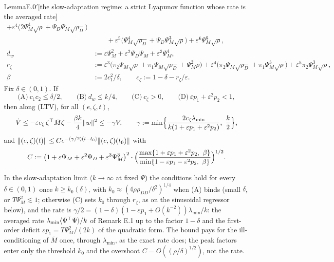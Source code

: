 \begin{thm}{Lemma}{E.0$'$}[the slow-adaptation regime: a strict Lyapunov function whose rate is the averaged rate]
\begin{align*}
    +\varepsilon^4\bigl(2\Psi_M^4\sqrt\rho+\Psi_D\Psi_M\sqrt{\rho_D}\bigr)\\
  &\qquad+\varepsilon^5\bigl(\Psi_M^4\sqrt{\rho_D}+\Psi_D\Psi_M^3\sqrt\rho\bigr)+\varepsilon^6\Psi_M^6\sqrt\rho,\\
  d_w&:=\varepsilon\Psi_M^2+\varepsilon^2\Psi_D\Psi_M+\varepsilon^3\Psi_M^4,\\
  r_\zeta&:=\varepsilon^3\bigl(\pi_2\Psi_M\sqrt\rho+\pi_1\Psi_M\sqrt{\rho_D}+\Psi_M^2\rho\bigr)
    +\varepsilon^4\bigl(\pi_2\Psi_M\sqrt{\rho_D}+\pi_1\Psi_M^3\sqrt\rho\bigr)+\varepsilon^5\pi_2\Psi_M^3\sqrt\rho,\\
  \beta&:=2c_1^2/\delta,\qquad c_\zeta:=1-\delta-r_\zeta/\varepsilon.
\end{align*}
Fix $\delta\in(0,1)$. If
\[
  \text{(A)}\ c_1c_2\le\delta/2,\qquad \text{(B)}\ d_w\le k/4,\qquad \text{(C)}\ c_\zeta>0,\qquad
  \text{(D)}\ \varepsilon p_1+\varepsilon^2p_2<1,
\]
then along \textup{(LTV)}, for all $(e,\zeta,t)$,
\[
  \dot V\le-\varepsilon c_\zeta\,\zeta^\top\bar M\zeta-\frac{\beta k}4\lVert w\rVert^2\le-\gamma V,\qquad
  \gamma:=\min\Bigl\{\frac{2c_\zeta\lambda_{\min}}{k(1+\varepsilon p_1+\varepsilon^2p_2)},\ \frac k2\Bigr\},
\]
and $\lVert (e,\zeta)(t)\rVert\le Ce^{-(\gamma/2)(t-t_0)}\lVert (e,\zeta)(t_0)\rVert$ with
\[
  C:=\bigl(1+\varepsilon\Psi_M+\varepsilon^2\Psi_D+\varepsilon^3\Psi_M^3\bigr)^2\cdot
  \Bigl(\frac{\max\{1+\varepsilon p_1+\varepsilon^2p_2,\ \beta\}}{\min\{1-\varepsilon p_1-\varepsilon^2p_2,\ \beta\}}\Bigr)^{1/2}.
\]

In the slow-adaptation limit ($k\to\infty$ at fixed $\Psi$) the conditions hold for every $\delta\in(0,1)$ once
$k\ge k_0(\delta)$, with $k_0\approx(4\rho\rho_{DD}/\delta^2)^{1/4}$ when (A) binds (small $\delta$, or
$T\Psi_M^2\lesssim1$; otherwise (C) sets $k_0$ through $r_\zeta$, as on the sinusoidal regressor below), and the rate
is $\gamma/2=(1-\delta)(1-\varepsilon p_1+O(k^{-2}))\lambda_{\min}/k$: the averaged rate
$\lambda_{\min}\langle\Psi^\top\Psi\rangle/k$ of Remark E.1 up to the factor $1-\delta$ and the first-order deficit
$\varepsilon p_1=T\Psi_M^2/(2k)$ of the quadratic form. The bound pays for the ill-conditioning of $\bar M$ once,
through $\lambda_{\min}$, as the exact rate does; the peak factors enter only the threshold $k_0$ and the overshoot
$C=O((\rho/\delta)^{1/2})$, not the rate.
\end{thm}

